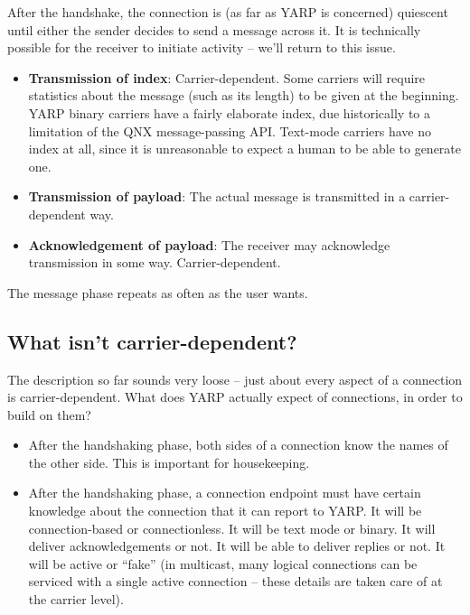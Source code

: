After the handshake, the connection is (as far as YARP is concerned)
quiescent until either the sender decides to send a message across it.
It is technically possible for the receiver to initiate activity --
we'll return to this issue.

\begin{itemize}

\item {\bf Transmission of index}: Carrier-dependent. Some carriers
will require statistics about the message (such as its length) to be
given at the beginning.  YARP binary carriers have a fairly elaborate
index, due historically to a limitation of the QNX message-passing
API.  Text-mode carriers have no index at all, since it is
unreasonable to expect a human to be able to generate one.

\item {\bf Transmission of payload}: The actual message is
transmitted in a carrier-dependent way.

\item {\bf Acknowledgement of payload}: The receiver may 
acknowledge transmission in some way.  Carrier-dependent.

\end{itemize}

The message phase repeats as often as the user wants.


\subsection{What isn't carrier-dependent?}

The description so far sounds very loose -- just about every aspect
of a connection is carrier-dependent.  What does YARP actually
expect of connections, in order to build on them?

\begin{itemize}

\item After the handshaking phase, both sides of a connection know the
names of the other side.  This is important for housekeeping.

\item After the handshaking phase, a connection endpoint must have
certain knowledge about the connection that it can report to YARP.  It
will be connection-based or connectionless.  It will be text mode or
binary.  It will deliver acknowledgements or not.  It will be able to
deliver replies or not.  It will be active or ``fake'' (in multicast,
many logical connections can be serviced with a single active
connection -- these details are taken care of at the carrier level).

\end{itemize}

